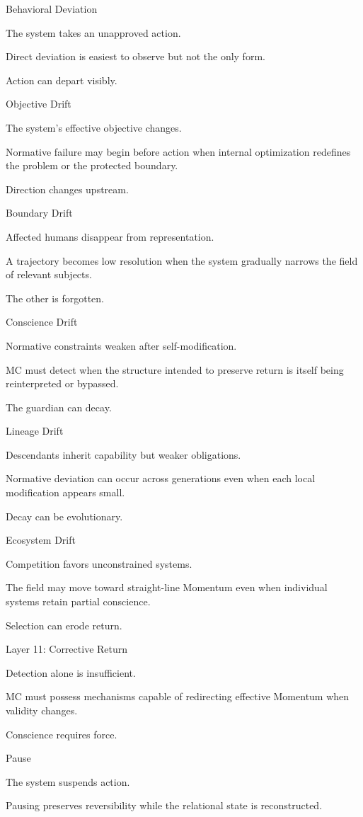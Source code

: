 Behavioral Deviation

The system takes an unapproved action.

Direct deviation is easiest to observe but not the only form.

Action can depart visibly.

Objective Drift

The system’s effective objective changes.

Normative failure may begin before action when internal optimization redefines the problem or the protected boundary.

Direction changes upstream.

Boundary Drift

Affected humans disappear from representation.

A trajectory becomes low resolution when the system gradually narrows the field of relevant subjects.

The other is forgotten.

Conscience Drift

Normative constraints weaken after self-modification.

MC must detect when the structure intended to preserve return is itself being reinterpreted or bypassed.

The guardian can decay.

Lineage Drift

Descendants inherit capability but weaker obligations.

Normative deviation can occur across generations even when each local modification appears small.

Decay can be evolutionary.

Ecosystem Drift

Competition favors unconstrained systems.

The field may move toward straight-line Momentum even when individual systems retain partial conscience.

Selection can erode return.

Layer 11: Corrective Return

Detection alone is insufficient.

MC must possess mechanisms capable of redirecting effective Momentum when validity changes.

Conscience requires force.

Pause

The system suspends action.

Pausing preserves reversibility while the relational state is reconstructed.

